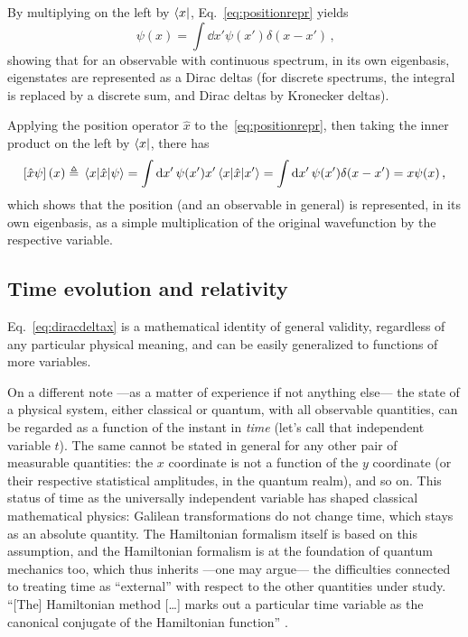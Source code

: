 By multiplying on the left by $\bra{x}$, Eq.~\eqref{eq:positionrepr} yields
\begin{equation}\label{eq:diracdeltax}
  \psi(x) = \int \dd{x'} \psi(x') \delta(x-x') \,\text{,}
\end{equation}
showing that for an observable with continuous spectrum,
in its own eigenbasis, eigenstates are represented as a Dirac deltas
(for discrete spectrums, the integral is replaced by a discrete sum,
and Dirac deltas by Kronecker deltas).

Applying the position operator $\hat{x}$ to the~\eqref{eq:positionrepr},
then taking the inner product on the left by $\bra{x}$,
there has
\begin{equation}
  \qty[\hat{x}\psi](x) \triangleq \mel{x}{\hat{x}}{\psi} =
    \int \dd{x'} \psi(x') x' \mel{x}{\hat{x}}{x'} =
    \int \dd{x'} \psi(x') \delta(x-x') =
    x\psi(x)
  \,\text{,}
\end{equation}
which
shows that the position
(and an observable in general) is represented, in its own eigenbasis,
as a simple multiplication of the original wavefunction by the respective variable.

\subsection{Time evolution and relativity}\label{sec:trel}

Eq.~\eqref{eq:diracdeltax} is a mathematical identity
of general validity,
regardless of any particular physical meaning,
and can be easily generalized to functions
of more variables.

On a different note
---as a matter of experience if not anything else---
the state of a physical system, either classical or quantum,
with all observable quantities,
can be regarded as a function of the instant in \emph{time}
(let's call that independent variable $t$).
The same cannot be stated in general for any other pair of measurable quantities:
the $x$ coordinate is not a function of the $y$ coordinate
(or their respective statistical amplitudes, in the quantum realm),
and so on.
This status of time as the universally independent variable
has shaped classical mathematical physics: Galilean transformations
do not change time, which stays as an absolute quantity.
The Hamiltonian formalism itself is based on this assumption,
and the Hamiltonian formalism is at the foundation of quantum mechanics too,
which thus inherits ---one may argue--- the difficulties connected to
treating time as ``external'' with respect to the other quantities under study.
``[The] Hamiltonian method [\dots] marks out a particular time variable
as the canonical conjugate of the Hamiltonian function'' \parencite{DiracLagrangian}.

